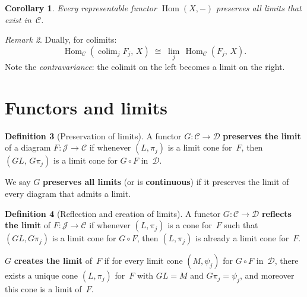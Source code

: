 \documentclass[a4paper,12pt]{book}
\DeclareMathOperator{\Hom}{Hom}
\DeclareMathOperator{\colim}{colim}
\theoremstyle{definition}
\newtheorem{definition}{Definition}[section]
\theoremstyle{plain}
\newtheorem{corollary}[definition]{Corollary}
\theoremstyle{remark}
\newtheorem{remark}[definition]{Remark}
\begin{document}
\begin{corollary}\label{cor:representable-preserves-limits}
Every representable functor $\Hom(X,-)$ preserves all limits
that exist in~$\mathcal{C}$.
\end{corollary}

\begin{remark}\label{rem:colim-hom}
Dually, for colimits:
\[
    \Hom_{\mathcal{C}}(\colim_j F_j,\, X)
    \;\cong\;
    \lim_j\, \Hom_{\mathcal{C}}(F_j,\, X).
\]
Note the \emph{contravariance}: the colimit on the left becomes a
limit on the right.
\end{remark}


\section{Functors and limits}\label{sec:functors-limits}

\begin{definition}[Preservation of limits]\label{def:preserve-limits}
A functor $G\colon\mathcal{C}\to\mathcal{D}$ \textbf{preserves the limit}
of a diagram $F\colon\mathcal{J}\to\mathcal{C}$ if whenever
$(L,\pi_j)$ is a limit cone for~$F$, then $(GL,\,G\pi_j)$ is a limit
cone for $G\circ F$ in~$\mathcal{D}$.

We say $G$ \textbf{preserves all limits} (or is
\textbf{continuous}) if it preserves
the limit of every diagram that admits a limit.
\end{definition}

\begin{definition}[Reflection and creation of limits]%
\label{def:reflect-create-limits}
A functor $G\colon\mathcal{C}\to\mathcal{D}$ \textbf{reflects the limit}
of $F\colon\mathcal{J}\to\mathcal{C}$ if whenever $(L,\pi_j)$ is a cone
for~$F$ such that $(GL,G\pi_j)$ is a limit cone for $G\circ F$,
then $(L,\pi_j)$ is already a limit cone for~$F$.

$G$ \textbf{creates the limit} of~$F$ if for every limit cone
$(M,\psi_j)$ for $G\circ F$ in~$\mathcal{D}$, there exists a unique
cone $(L,\pi_j)$ for~$F$ with $GL = M$ and $G\pi_j = \psi_j$,
and moreover this cone is a limit of~$F$.
\end{definition}
\end{document}
